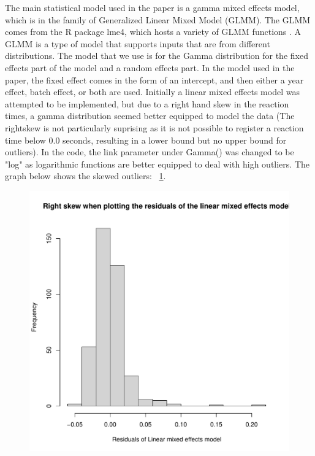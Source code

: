 \documentclass[12pt, letterpaper, titlepage]{article}
\begin{document}
The main statistical model used in the paper is a gamma mixed effects model, which is
in the family of Generalized Linear Mixed Model (GLMM). The GLMM comes from the R package 
lme4, which hosts a variety of GLMM functions \citep{Rpkg:lme4}.  A GLMM is a type of model
that supports inputs that are from different distributions.  The model that we use is for the
Gamma distribution for the fixed effects part of the model and a random effects part.  In
the model used in the paper, the fixed effect comes in the form of an intercept, and then
either a year effect, batch effect, or both are used.  Initially a linear mixed effects
model was attempted to be implemented, but due to a right hand skew in the reaction times, 
a gamma distribution seemed better equipped to model the data (The rightskew is not 
particularly suprising as it is not possible to register a reaction time below 0.0 
seconds, resulting in a lower bound but no upper bound for outliers). In the code, the 
link parameter under Gamma() was changed to be "log" as logarithmic functions are better 
equipped to deal with high outliers.  The graph below shows the skewed outliers: ~\ref{fig:Skew}.
\begin{figure}[h]
  \centering 
  \includegraphics[scale = 0.6]{Skew}
  \label{fig:Skew}
\end{figure}
\end{document}
